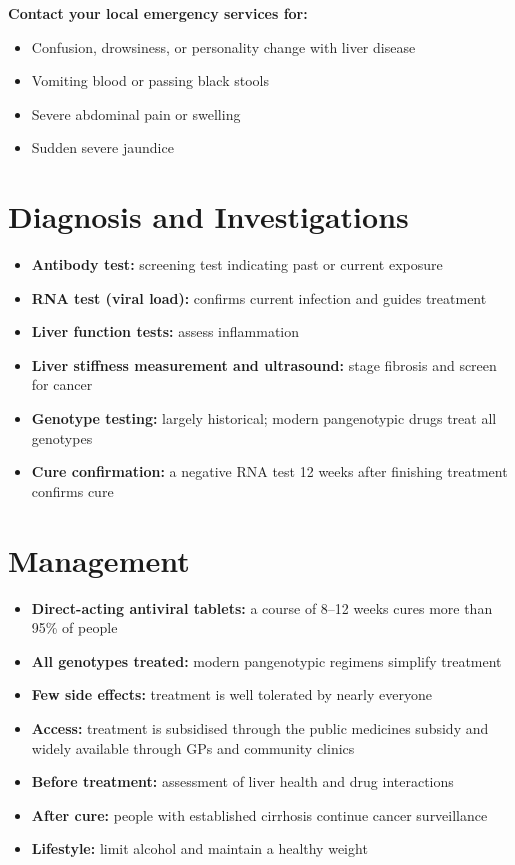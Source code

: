 \textbf{Contact your local emergency services for:}
\begin{itemize}
    \item Confusion, drowsiness, or personality change with liver disease
    \item Vomiting blood or passing black stools
    \item Severe abdominal pain or swelling
    \item Sudden severe jaundice
\end{itemize}

\section*{Diagnosis and Investigations}
\begin{itemize}
    \item \textbf{Antibody test:} screening test indicating past or current exposure
    \item \textbf{RNA test (viral load):} confirms current infection and guides treatment
    \item \textbf{Liver function tests:} assess inflammation
    \item \textbf{Liver stiffness measurement and ultrasound:} stage fibrosis and screen for cancer
    \item \textbf{Genotype testing:} largely historical; modern pangenotypic drugs treat all genotypes
    \item \textbf{Cure confirmation:} a negative RNA test 12 weeks after finishing treatment confirms cure
\end{itemize}

\section*{Management}
\begin{itemize}
    \item \textbf{Direct-acting antiviral tablets:} a course of 8--12 weeks cures more than 95\% of people
    \item \textbf{All genotypes treated:} modern pangenotypic regimens simplify treatment
    \item \textbf{Few side effects:} treatment is well tolerated by nearly everyone
    \item \textbf{Access:} treatment is subsidised through the public medicines subsidy and widely available through GPs and community clinics
    \item \textbf{Before treatment:} assessment of liver health and drug interactions
    \item \textbf{After cure:} people with established cirrhosis continue cancer surveillance
    \item \textbf{Lifestyle:} limit alcohol and maintain a healthy weight
\end{itemize}

